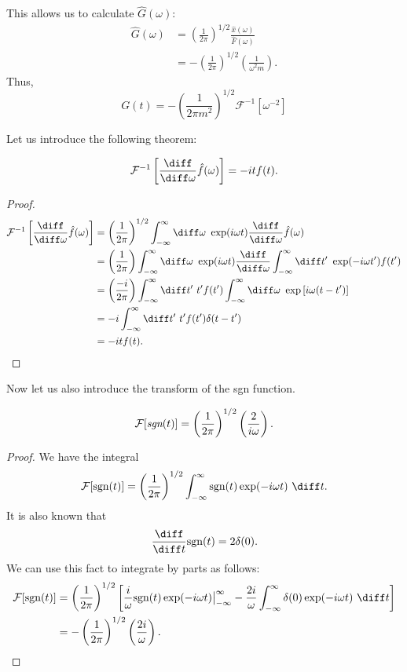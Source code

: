 \documentclass[12pt]{article}
\begin{document}
This allows us to calculate $\hat{G}(\omega) :$
\begin{align*}
	\hat{G}(\omega) &= \left(\frac{1}{2\pi}\right)^{1/2}\frac{\hat{x}(\omega)}{\hat{F}(\omega)} \\
			&= -\left(\frac{1}{2\pi}\right)^{1/2} \left(\frac{1}{\omega^2 m}\right).
\end{align*}
Thus, 
\[
	G(t) = -\left( \frac{1}{2\pi m^2} \right)^{1/2} \mathcal{F}^{-1}\left[ \omega^{-2} \right]
\] 

Let us introduce the following theorem: 
\begin{theorem}
	\[
		\mathcal{F}^{-1}\left[ \frac{\diff }{\diff \omega}\hat{f}(\omega) \right] = -i t f(t).
	\]
	
\end{theorem}
\begin{proof}
	\begin{align*}
		\mathcal{F}^{-1}\left[ \frac{\diff}{\diff \omega}\hat{f}(\omega) \right] &= \left( \frac{1}{2\pi} \right)^{1/2} \int_{-\infty}^{\infty} \diff \omega \ \exp(i\omega t)\frac{\diff }{\diff \omega}\hat{f}(\omega) \\
											 &= \left( \frac{1}{2\pi} \right)\int_{-\infty}^{\infty} \diff \omega \ \exp(i\omega t) \frac{\diff }{\diff \omega}\int_{-\infty}^{\infty} \diff t' \ \exp(-i\omega t')f(t') \\
											 &= \left( \frac{-i}{2\pi} \right)\int_{-\infty} ^{\infty} \diff t' \ t' f(t') \int_{-\infty}^{\infty} \diff \omega \ \exp \left[ i \omega(t-t') \right] \\
											&=  -i\int_{-\infty}^{\infty} \diff t' \ t'f(t')\delta(t-t') \\
											 &= -itf(t).
	\end{align*}
\end{proof}

Now let us also introduce the transform of the sgn function. 
\begin{theorem}
	\[
		\mathcal{F}[\emph{sgn}(t)] = \left( \frac{1}{2\pi} \right)^{1/2} \left( \frac{2}{i\omega} \right).
	\]
	
\end{theorem}
\begin{proof}
	We have the integral
	\[
		\mathcal{F} [ \text{sgn}(t) ] = \left( \frac{1}{2\pi} \right)^{1/2} \int_{-\infty}^{\infty} \text{sgn}(t)\exp(-i\omega t)\ \diff t. 
	\]
	It is also known that
	\[
		\frac{\diff}{\diff t}\text{sgn}(t) = 2\delta(0).
	\]
	We can use this fact to integrate by parts as follows:
	\begin{align*}
		\mathcal{F}[\text{sgn}(t)] &= \left( \frac{1}{2\pi} \right)^{1/2} \bigg[ \frac{i}{\omega} \text{sgn}(t) \exp(-i\omega t)\big|_{-\infty}^{\infty} - \frac{2i}{\omega} \int_{-\infty}^{\infty} \delta(0) \exp(-i \omega t)\ \diff t \bigg] \\
					   &= -\left( \frac{1}{2\pi} \right)^{1/2} \left( \frac{2i}{\omega} \right).
	\end{align*}
	
\end{proof}
\end{document}
